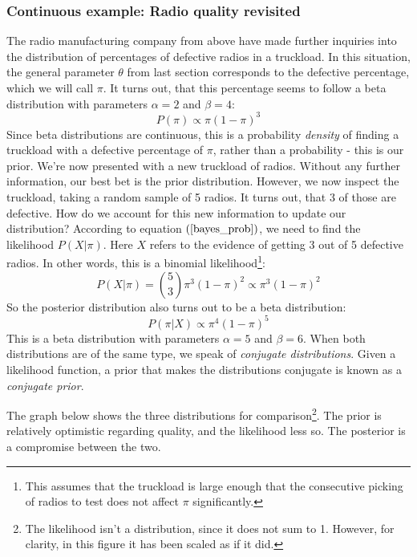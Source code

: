 \documentclass[12pt, a4paper]{article}
\begin{document}
\subsubsection{Continuous example: Radio quality revisited}
The radio manufacturing company from above have made further inquiries into the distribution of percentages of defective radios in a truckload. In this situation, the general parameter $\theta$ from last section corresponds to the defective percentage, which we will call $\pi$. It turns out, that this percentage seems to follow a beta distribution with parameters $\alpha=2$ and $\beta=4$:
\begin{equation}
P(\pi)\propto\pi(1-\pi)^3
\end{equation}
Since beta distributions are continuous, this is a probability \textit{density} of finding a truckload with a defective percentage of $\pi$, rather than a probability - this is our prior. We're now presented with a new truckload of radios. Without any further information, our best bet is the prior distribution. However, we now inspect the truckload, taking a random sample of 5 radios. It turns out, that 3 of those are defective. How do we account for this new information to update our distribution? According to equation $(\ref{bayes_prob})$, we need to find the likelihood $P(X|\pi)$. Here $X$ refers to the evidence of getting 3 out of 5 defective radios. In other words, this is a binomial likelihood\footnote{This assumes that the truckload is large enough that the consecutive picking of radios to test does not affect $\pi$ significantly.}:
\begin{equation}
P(X|\pi)=\binom{5}{3}\pi^3(1-\pi)^2\propto\pi^3(1-\pi)^2
\end{equation}
So the posterior distribution also turns out to be a beta distribution:
\begin{equation}
P(\pi|X)\propto\pi^4(1-\pi)^5
\end{equation}
This is a beta distribution with parameters $\alpha=5$ and $\beta=6$. When both distributions are of the same type, we speak of \textit{conjugate distributions}. Given a likelihood function, a prior that makes the distributions conjugate is known as a \textit{conjugate prior}.\par
The graph below shows the three distributions for comparison\footnote{The likelihood isn't a distribution, since it does not sum to 1. However, for clarity, in this figure it has been scaled as if it did.}. The prior is relatively optimistic regarding quality, and the likelihood less so. The posterior is a compromise between the two.
\end{document}
